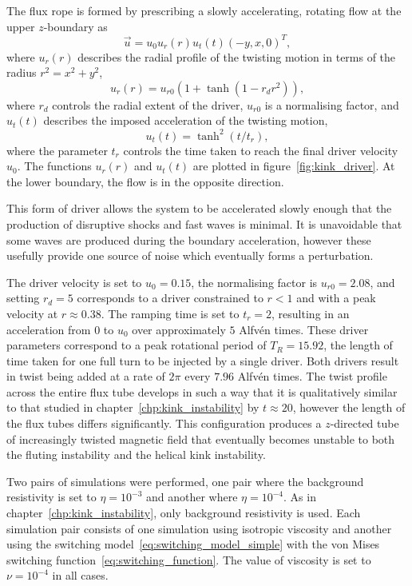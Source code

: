 The flux rope is formed by prescribing a slowly accelerating, rotating flow at the upper $z$-boundary as
\begin{equation}
  \label{eq:null_twisting_profile}
  \vec{u} = u_0 u_r(r) u_t(t) (-y, x, 0)^T,
\end{equation}
where $u_r(r)$ describes the radial profile of the twisting motion in terms of the radius $r^2 = x^2 + y^2$,
\begin{equation}
  \label{eq:radial_twisting_function}
  u_r(r) = u_{r0}(1 + \tanh(1 - r_d r^2)),
\end{equation}
where $r_d$ controls the radial extent of the driver, $u_{r0}$ is a normalising factor, and $u_t(t)$ describes the imposed acceleration of the twisting motion,
\begin{equation}
  \label{eq:ramping_up_function}
  u_t(t) = \tanh^2(t/t_r),
\end{equation}
where the parameter $t_r$ controls the time taken to reach the final driver velocity $u_0$. The functions $u_r(r)$ and $u_t(t)$ are plotted in figure~\ref{fig:kink_driver}. At the lower boundary, the flow is in the opposite direction.

This form of driver allows the system to be accelerated slowly enough that the production of disruptive shocks and fast waves is minimal. It is unavoidable that some waves are produced during the boundary acceleration, however these usefully provide one source of noise which eventually forms a perturbation.

The driver velocity is set to $u_0 = 0.15$, the normalising factor is $u_{r0} = 2.08$, and setting $r_d = 5$ corresponds to a driver constrained to $r<1$ and with a peak velocity at $r\approx 0.38$. The ramping time is set to $t_r = 2$, resulting in an acceleration from $0$ to $u_0$ over approximately $5$ Alfv\'en times. These driver parameters correspond to a peak rotational period of $T_R = 15.92$, the length of time taken for one full turn to be injected by a single driver. Both drivers result in twist being added at a rate of $2\pi$ every $7.96$ Alfv\'en times. The twist profile across the entire flux tube develops in such a way that it is qualitatively similar to that studied in chapter~\ref{chp:kink_instability} by $t\approx 20$, however the length of the flux tubes differs significantly. This configuration produces a $z$-directed tube of increasingly twisted magnetic field that eventually becomes unstable to both the fluting instability and the helical kink instability.

Two pairs of simulations were performed, one pair where the background resistivity is set to $\eta=10^{-3}$ and another where $\eta=10^{-4}$. As in chapter~\ref{chp:kink_instability}, only background resistivity is used. Each simulation pair consists of one simulation using isotropic viscosity and another using the switching model~\eqref{eq:switching_model_simple} with the von Mises switching function~\eqref{eq:switching_function}. The value of viscosity is set to $\nu = 10^{-4}$ in all cases.


